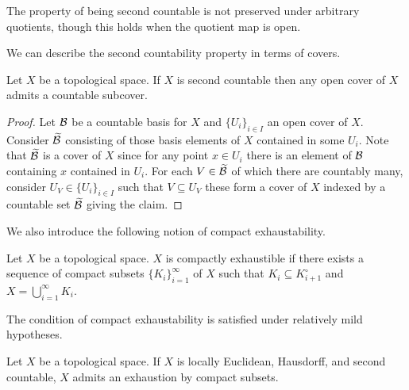 \begin{remark}
    The property of being second countable is not preserved under arbitrary quotients, though this holds when the quotient map is open. 
\end{remark}
We can describe the second countability property in terms of covers. 
\begin{proposition}\label{prop: second countability via covers}
    Let $X$ be a topological space. If $X$ is second countable then any open cover of $X$ admits a countable subcover. 
\end{proposition}
\begin{proof}
    Let $\mathcal{B}$ be a countable basis for $X$ and $\{U_{i}\}_{i\in I}$ an open cover of $X$. Consider $\widetilde{\mathcal{B}}$ consisting of those basis elements of $X$ contained in some $U_{i}$. Note that $\widetilde{\mathcal{B}}$ is a cover of $X$ since for any point $x\in U_{i}$ there is an element of $\mathcal{B}$ containing $x$ contained in $U_{i}$. For each $V\in\widetilde{\mathcal{B}}$ of which there are countably many, consider $U_{V}\in\{U_{i}\}_{i\in I}$ such that $V\subseteq U_{V}$ these form a cover of $X$ indexed by a countable set $\widetilde{\mathcal{B}}$ giving the claim. 
\end{proof}
We also introduce the following notion of compact exhaustability. 
\begin{definition}\label{def: compact exhaustability}
    Let $X$ be a topological space. $X$ is compactly exhaustible if there exists a sequence of compact subsets $\{K_{i}\}_{i=1}^{\infty}$ of $X$ such that $K_{i}\subseteq K_{i+1}^{\circ}$ and $X=\bigcup_{i=1}^{\infty}K_{i}$.
\end{definition}
The condition of compact exhaustability is satisfied under relatively mild hypotheses. 
\begin{proposition}\label{prop: locally euclidean, Hausdorff, second countable implies compactly exhaustible}
    Let $X$ be a topological space. If $X$ is locally Euclidean, Hausdorff, and second countable, $X$ admits an exhaustion by compact subsets. 
\end{proposition}

